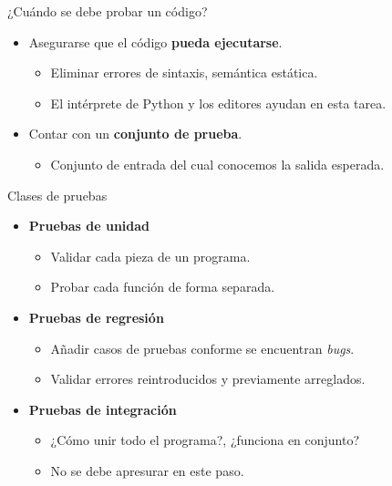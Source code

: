 \documentclass[mathserif]{beamer}
\begin{document}
\begin{frame}[fragile]{¿Cuándo se debe probar un código?}
    \begin{itemize}
        \item Asegurarse que el código {\blue\bfseries pueda ejecutarse}.
        \begin{itemize}
            \item Eliminar errores de sintaxis, semántica estática.
            \item El intérprete de Python y los editores ayudan en esta tarea.
        \end{itemize}
        
        \item Contar con un {\blue\bfseries conjunto de prueba}.
        \begin{itemize}
            \item Conjunto de entrada del cual conocemos la salida esperada.
        \end{itemize}
    \end{itemize}
\end{frame}

\begin{frame}[fragile]{Clases de pruebas}
    \begin{itemize}
        \item {\blue\bfseries Pruebas de unidad}
        \begin{itemize}
            \item Validar cada pieza de un programa.
            \item {\orange Probar cada función} de forma separada.
        \end{itemize}
        
        \item {\blue\bfseries Pruebas de regresión}
        \begin{itemize}
            \item Añadir casos de pruebas conforme se encuentran \textit{bugs}.
            \item {\orange Validar} errores reintroducidos y previamente arreglados.
        \end{itemize}
        
        \item {\blue\bfseries Pruebas de integración}
        \begin{itemize}
            \item ¿Cómo unir todo el programa?, ¿funciona en conjunto?
            \item No se debe apresurar en este paso.
        \end{itemize}
    \end{itemize}
\end{frame}
\end{document}
